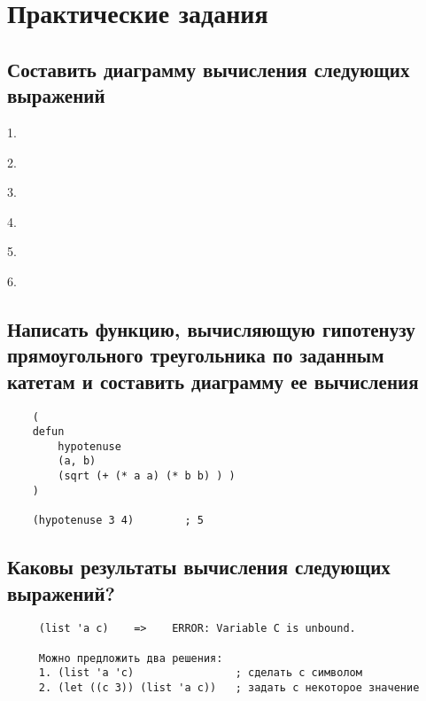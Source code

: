 \chapter{Практические задания}

\section{Составить диаграмму вычисления следующих выражений}

1. 


2. 


3. 


4. 


5. 


6. 


\newpage

\section{Написать функцию, вычисляющую гипотенузу прямоугольного треугольника по заданным катетам и составить диаграмму ее вычисления}

\begin{lstlisting}
    (
    defun
        hypotenuse
        (a, b)
        (sqrt (+ (* a a) (* b b) ) )
    )

    (hypotenuse 3 4)        ; 5
\end{lstlisting}



\newpage


\section{Каковы результаты вычисления следующих выражений?}

\begin{lstlisting}
     (list 'a c)    =>    ERROR: Variable C is unbound.

     Можно предложить два решения: 
     1. (list 'a 'c)                ; сделать c символом
     2. (let ((c 3)) (list 'a c))   ; задать c некоторое значение
\end{lstlisting}


